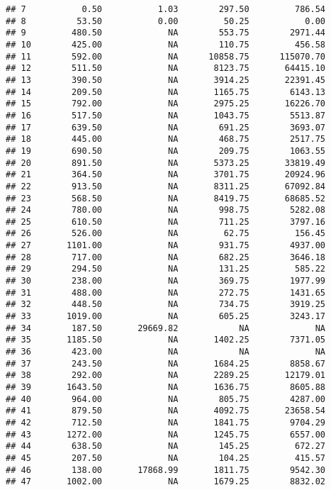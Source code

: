 \documentclass[]{article}
\begin{document}
\begin{verbatim}
## 7           0.50           1.03        297.50         786.54
## 8          53.50           0.00         50.25           0.00
## 9         480.50             NA        553.75        2971.44
## 10        425.00             NA        110.75         456.58
## 11        592.00             NA      10858.75      115070.70
## 12        511.50             NA       8123.75       64415.10
## 13        390.50             NA       3914.25       22391.45
## 14        209.50             NA       1165.75        6143.13
## 15        792.00             NA       2975.25       16226.70
## 16        517.50             NA       1043.75        5513.87
## 17        639.50             NA        691.25        3693.07
## 18        445.00             NA        468.75        2517.75
## 19        690.50             NA        209.75        1063.55
## 20        891.50             NA       5373.25       33819.49
## 21        364.50             NA       3701.75       20924.96
## 22        913.50             NA       8311.25       67092.84
## 23        568.50             NA       8419.75       68685.52
## 24        780.00             NA        998.75        5282.08
## 25        610.50             NA        711.25        3797.16
## 26        526.00             NA         62.75         156.45
## 27       1101.00             NA        931.75        4937.00
## 28        717.00             NA        682.25        3646.18
## 29        294.50             NA        131.25         585.22
## 30        238.00             NA        369.75        1977.99
## 31        488.00             NA        272.75        1431.65
## 32        448.50             NA        734.75        3919.25
## 33       1019.00             NA        605.25        3243.17
## 34        187.50       29669.82            NA             NA
## 35       1185.50             NA       1402.25        7371.05
## 36        423.00             NA            NA             NA
## 37        243.50             NA       1684.25        8858.67
## 38        292.00             NA       2289.25       12179.01
## 39       1643.50             NA       1636.75        8605.88
## 40        964.00             NA        805.75        4287.00
## 41        879.50             NA       4092.75       23658.54
## 42        712.50             NA       1841.75        9704.29
## 43       1272.00             NA       1245.75        6557.00
## 44        638.50             NA        145.25         672.27
## 45        207.50             NA        104.25         415.57
## 46        138.00       17868.99       1811.75        9542.30
## 47       1002.00             NA       1679.25        8832.02

\end{verbatim}
\end{document}

